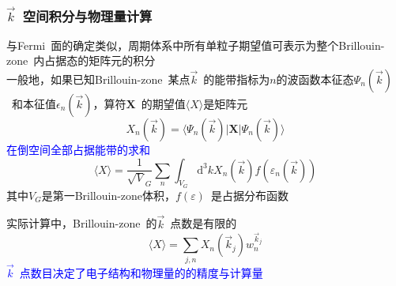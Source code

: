 \frame
{
\frametitle{$\vec k$~空间积分与物理量计算}
与\textrm{Fermi~}面的确定类似，周期体系中所有单粒子期望值可表示为整个\textrm{Brillouin-zone~}内占据态的矩阵元的积分\\

一般地，如果已知\textrm{Brillouin-zone~}某点$\vec k$~的能带指标为$n$的波函数本征态$\Psi_n(\vec k)$~和本征值$\epsilon_n(\vec k)$，算符$\mathbf{X}$~的期望值$\langle X \rangle$是矩阵元
\begin{displaymath}
	X_n(\vec k)=\langle\Psi_n(\vec k)|\mathbf{X}|\Psi_n(\vec k)\rangle 
\end{displaymath}
\textcolor{blue}{在倒空间全部占据能带的求和}
\begin{displaymath}
	\langle X\rangle=\dfrac1{\sqrt V_G}\sum_n\int_{V_G}\mathrm{d}^3kX_n(\vec k)f(\varepsilon_n(\vec k))
\end{displaymath}
其中$V_G$是第一\textrm{Brillouin-zone}体积，$f(\varepsilon)$~是占据分布函数

实际计算中，\textrm{Brillouin-zone~}的$\vec k$~点数是有限的
\begin{displaymath}
	\langle X\rangle=\sum_{j,n}X_n(\vec k_j)w_n^{\vec k_j}
\end{displaymath} 
\textcolor{blue}{$\vec k$~点数目决定了电子结构和物理量的的精度与计算量}
}

